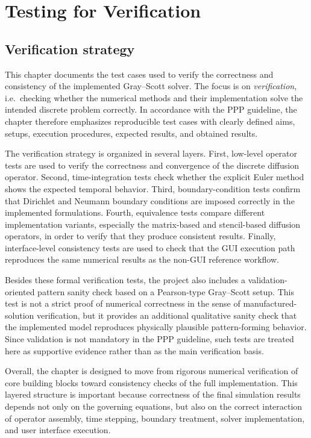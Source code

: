 \chapter{Testing for Verification}
\label{chap:verification}

\section{Verification strategy}
\label{sec:verification_strategy}

This chapter documents the test cases used to verify the correctness and consistency of the implemented Gray--Scott solver. The focus is on \emph{verification}, i.e.\ checking whether the numerical methods and their implementation solve the intended discrete problem correctly. In accordance with the PPP guideline, the chapter therefore emphasizes reproducible test cases with clearly defined aims, setups, execution procedures, expected results, and obtained results.

The verification strategy is organized in several layers. First, low-level operator tests are used to verify the correctness and convergence of the discrete diffusion operator. Second, time-integration tests check whether the explicit Euler method shows the expected temporal behavior. Third, boundary-condition tests confirm that Dirichlet and Neumann boundary conditions are imposed correctly in the implemented formulations. Fourth, equivalence tests compare different implementation variants, especially the matrix-based and stencil-based diffusion operators, in order to verify that they produce consistent results. Finally, interface-level consistency tests are used to check that the GUI execution path reproduces the same numerical results as the non-GUI reference workflow.

Besides these formal verification tests, the project also includes a validation-oriented pattern sanity check based on a Pearson-type Gray--Scott setup. This test is not a strict proof of numerical correctness in the sense of manufactured-solution verification, but it provides an additional qualitative sanity check that the implemented model reproduces physically plausible pattern-forming behavior. Since validation is not mandatory in the PPP guideline, such tests are treated here as supportive evidence rather than as the main verification basis.

Overall, the chapter is designed to move from rigorous numerical verification of core building blocks toward consistency checks of the full implementation. This layered structure is important because correctness of the final simulation results depends not only on the governing equations, but also on the correct interaction of operator assembly, time stepping, boundary treatment, solver implementation, and user interface execution.

